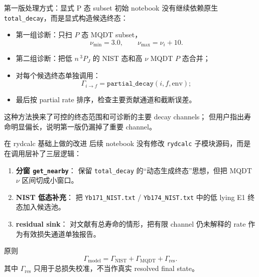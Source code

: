 \documentclass[aspectratio=169,11pt]{ctexbeamer}
\begin{document}
\begin{frame}{第一版处理方式：显式 P 态 subset}
  初始 notebook 没有继续依赖原生 \texttt{total\_decay}，而是显式构造候选终态：
  \begin{itemize}
    \item 第一组诊断：只扫 \(P\) 态 MQDT subset，
      \[
        \nu_{\min}=3.0,\qquad \nu_{\max}=\nu_i+10.
      \]
    \item 第二组诊断：把低 \(n\,{}^3P_J\) 的 NIST 态和高 \(\nu\) MQDT \(P\) 态合并；
    \item 对每个候选终态单独调用：
      \[
        \Gamma_{i\rightarrow f}
        =
        \texttt{partial\_decay}(i,f,\mathrm{env});
      \]
    \item 最后按 partial rate 排序，检查主要贡献通道和截断误差。
  \end{itemize}

  这种方法换来了可控的终态范围和可诊断的主要 decay channels；
  但用户指出寿命明显偏长，说明第一版仍漏掉了重要 channel。
\end{frame}

\begin{frame}{在 rydcalc 基础上做的改进}
  后续 notebook 没有修改 \texttt{rydcalc} 子模块源码，而是在调用层补了三层逻辑：
  \begin{enumerate}
    \item \textbf{分窗 \texttt{get\_nearby}}：
      保留 \texttt{total\_decay} 的“动态生成终态”思想，但把 MQDT \(\nu\) 区间切成小窗口。
    \item \textbf{NIST 低态补充}：
      把 \texttt{Yb171\_NIST.txt} / \texttt{Yb174\_NIST.txt} 中的低 lying E1 终态加入候选池。
    \item \textbf{residual sink}：
      对文献有总寿命的情形，把有限 channel 仍未解释的 rate 作为有效损失通道单独报告。
  \end{enumerate}

  \begin{block}{原则}
    \[
      \Gamma_{\mathrm{model}}
      =
      \Gamma_{\mathrm{NIST}}
      +
      \Gamma_{\mathrm{MQDT}}
      +
      \Gamma_{\mathrm{res}}.
    \]
    其中 \(\Gamma_{\mathrm{res}}\) 只用于总损失校准，不当作真实 resolved final state。
  \end{block}
\end{frame}
\end{document}
